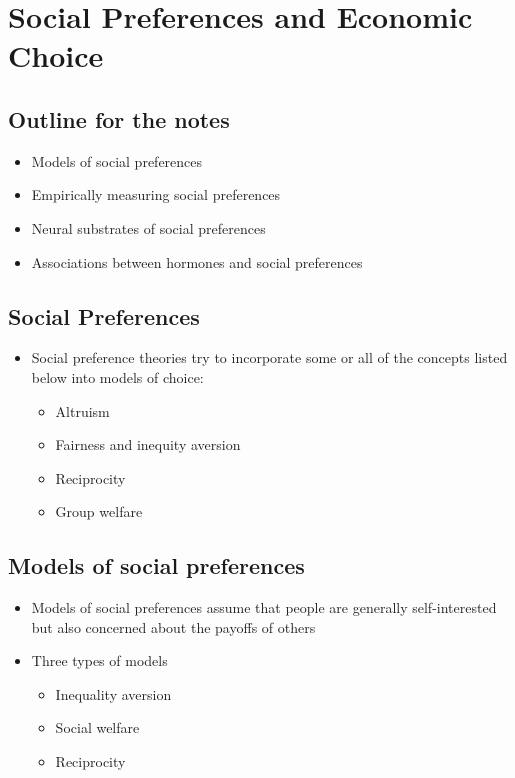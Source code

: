 \section{Social Preferences and Economic Choice}
\subsection{Outline for the notes}
\begin{itemize}
    \item Models of social preferences
    \item Empirically measuring social preferences
    \item Neural substrates of social preferences
    \item Associations between hormones and social preferences
\end{itemize}
\subsection{Social Preferences}
\begin{itemize}
    \item Social preference theories try to incorporate some or all of the concepts listed below into models of choice:
    \begin{itemize}
        \item Altruism
        \item Fairness and inequity aversion
        \item Reciprocity
        \item Group welfare
    \end{itemize}
\end{itemize}
\subsection{Models of social preferences}
\begin{itemize}
    \item Models of social preferences assume that people are generally self-interested but also concerned about the payoffs of others
    \item Three types of models
    \begin{itemize}
        \item Inequality aversion
        \item Social welfare
        \item Reciprocity
    \end{itemize}
\end{itemize}
